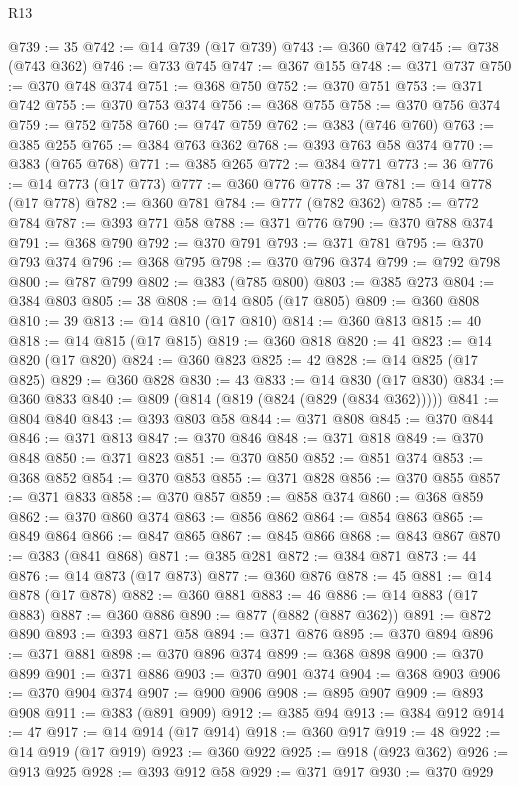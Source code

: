 \begin{lexlean}{R13}
\begin{coremodule}
{{{{{{{{{{{{{{{{{{{{{{{{{{{{{{{{{{{{{{{{{{{{{{{{{{{{{{@739 := 35
@742 := @14 @739 (@17 @739)
@743 := @360 @742
@745 := @738 (@743 @362)
@746 := @733 @745
@747 := @367 @155
@748 := @371 @737
@750 := @370 @748 @374
@751 := @368 @750
@752 := @370 @751
@753 := @371 @742
@755 := @370 @753 @374
@756 := @368 @755
@758 := @370 @756 @374
@759 := @752 @758
@760 := @747 @759
@762 := @383 (@746 @760)
@763 := @385 @255
@765 := @384 @763 @362
@768 := @393 @763 @58 @374
@770 := @383 (@765 @768)
@771 := @385 @265
@772 := @384 @771
@773 := 36
@776 := @14 @773 (@17 @773)
@777 := @360 @776
@778 := 37
@781 := @14 @778 (@17 @778)
@782 := @360 @781
@784 := @777 (@782 @362)
@785 := @772 @784
@787 := @393 @771 @58
@788 := @371 @776
@790 := @370 @788 @374
@791 := @368 @790
@792 := @370 @791
@793 := @371 @781
@795 := @370 @793 @374
@796 := @368 @795
@798 := @370 @796 @374
@799 := @792 @798
@800 := @787 @799
@802 := @383 (@785 @800)
@803 := @385 @273
@804 := @384 @803
@805 := 38
@808 := @14 @805 (@17 @805)
@809 := @360 @808
@810 := 39
@813 := @14 @810 (@17 @810)
@814 := @360 @813
@815 := 40
@818 := @14 @815 (@17 @815)
@819 := @360 @818
@820 := 41
@823 := @14 @820 (@17 @820)
@824 := @360 @823
@825 := 42
@828 := @14 @825 (@17 @825)
@829 := @360 @828
@830 := 43
@833 := @14 @830 (@17 @830)
@834 := @360 @833
@840 := @809 (@814 (@819 (@824 (@829 (@834 @362)))))
@841 := @804 @840
@843 := @393 @803 @58
@844 := @371 @808
@845 := @370 @844
@846 := @371 @813
@847 := @370 @846
@848 := @371 @818
@849 := @370 @848
@850 := @371 @823
@851 := @370 @850
@852 := @851 @374
@853 := @368 @852
@854 := @370 @853
@855 := @371 @828
@856 := @370 @855
@857 := @371 @833
@858 := @370 @857
@859 := @858 @374
@860 := @368 @859
@862 := @370 @860 @374
@863 := @856 @862
@864 := @854 @863
@865 := @849 @864
@866 := @847 @865
@867 := @845 @866
@868 := @843 @867
@870 := @383 (@841 @868)
@871 := @385 @281
@872 := @384 @871
@873 := 44
@876 := @14 @873 (@17 @873)
@877 := @360 @876
@878 := 45
@881 := @14 @878 (@17 @878)
@882 := @360 @881
@883 := 46
@886 := @14 @883 (@17 @883)
@887 := @360 @886
@890 := @877 (@882 (@887 @362))
@891 := @872 @890
@893 := @393 @871 @58
@894 := @371 @876
@895 := @370 @894
@896 := @371 @881
@898 := @370 @896 @374
@899 := @368 @898
@900 := @370 @899
@901 := @371 @886
@903 := @370 @901 @374
@904 := @368 @903
@906 := @370 @904 @374
@907 := @900 @906
@908 := @895 @907
@909 := @893 @908
@911 := @383 (@891 @909)
@912 := @385 @94
@913 := @384 @912
@914 := 47
@917 := @14 @914 (@17 @914)
@918 := @360 @917
@919 := 48
@922 := @14 @919 (@17 @919)
@923 := @360 @922
@925 := @918 (@923 @362)
@926 := @913 @925
@928 := @393 @912 @58
@929 := @371 @917
@930 := @370 @929
}}}}}}}}}}}}}}}}}}}}}}}}}}}}}}}}}}}}}}}}}}}}}}}}}}}}}}
\end{coremodule}
\end{lexlean}
